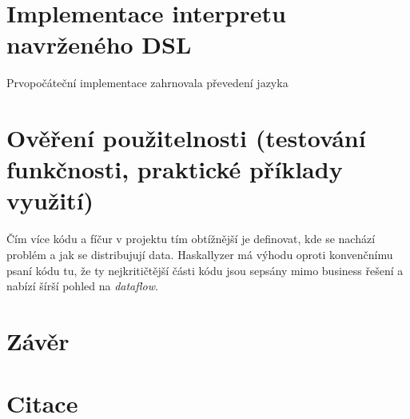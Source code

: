 \documentclass[male,czech]{kithesis}
\begin{document}

\chapter{Implementace interpretu navrženého DSL}

Prvopočáteční implementace zahrnovala převedení jazyka 

\chapter{Ověření použitelnosti (testování funkčnosti, praktické příklady využití)}

Čím více kódu a fíčur v projektu tím obtížnější je definovat, kde se nachází problém a jak se distribujují 
data. Haskallyzer má výhodu oproti konvenčnímu psaní kódu tu, že ty nejkritičtější části kódu jsou sepsány mimo 
business řešení a nabízí šírší pohled na \textit{dataflow}.



\chapter{Závěr}

\chapter{Citace}


\cite{Katuscakc}
\cite{IntroToLLVM}
\printbibliography


\appendix
\end{document}
